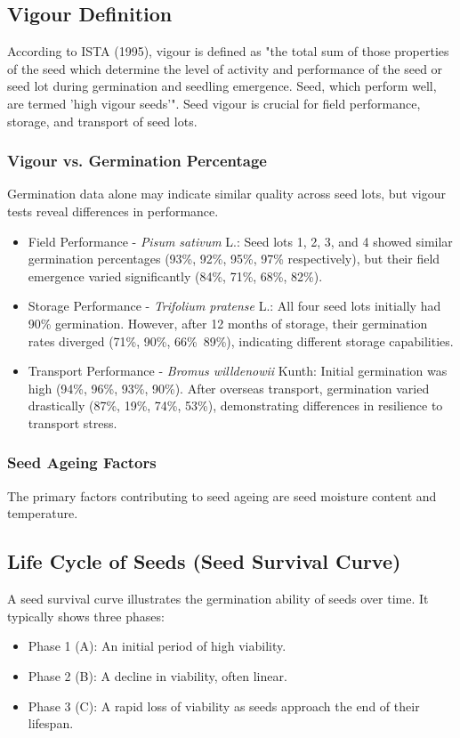 \subsection{Vigour Definition} 
According to ISTA (1995), vigour is defined as "the total sum of those properties of the seed which determine the level of activity and performance of the seed or seed lot during germination and seedling emergence. Seed, which perform well, are termed ’high vigour seeds’". Seed vigour is crucial for field performance, storage, and transport of seed lots.

\subsubsection*{Vigour vs. Germination Percentage} 
Germination data alone may indicate similar quality across seed lots, but vigour tests reveal differences in performance. 

\begin{itemize} 
    \item Field Performance - \textit{Pisum sativum} L.: Seed lots 1, 2, 3, and 4 showed similar germination percentages (93\%, 92\%, 95\%, 97\% respectively), but their field emergence varied significantly (84\%, 71\%, 68\%, 82\%). 
    \item Storage Performance - \textit{Trifolium pratense} L.: All four seed lots initially had 90\% germination. However, after 12 months of storage, their germination rates diverged (71\%, 90\%, 66\%\, 89\%), indicating different storage capabilities. 
    \item Transport Performance - \textit{Bromus willdenowii} Kunth: Initial germination was high (94\%, 96\%, 93\%, 90\%). After overseas transport, germination varied drastically (87\%, 19\%, 74\%, 53\%), demonstrating differences in resilience to transport stress. 
\end{itemize}

\subsubsection*{Seed Ageing Factors} 
The primary factors contributing to seed ageing are seed moisture content and temperature.

\subsection{Life Cycle of Seeds (Seed Survival Curve)} 
A seed survival curve illustrates the germination ability of seeds over time. It typically shows three phases: 
\begin{itemize} 
    \item Phase 1 (A): An initial period of high viability. 
    \item Phase 2 (B): A decline in viability, often linear. 
    \item Phase 3 (C): A rapid loss of viability as seeds approach the end of their lifespan. 
\end{itemize} 

